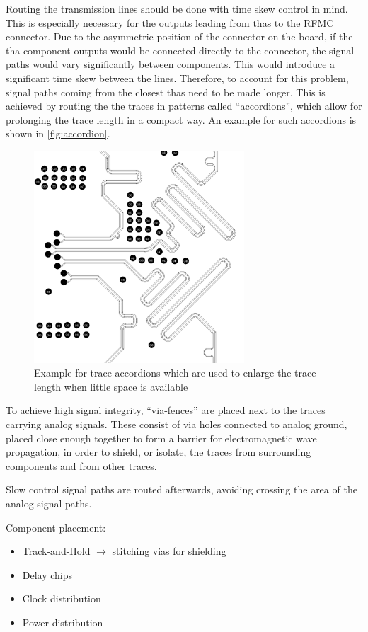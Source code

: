 Routing the transmission lines should be done with time skew control in mind. 
This is especially necessary for the outputs leading from \glspl{tha} to the RFMC connector. 
Due to the asymmetric position of the connector on the board, if the \gls{tha} component outputs would be connected directly to the connector, the signal paths would vary significantly between components.
This would introduce a significant time skew between the lines.
Therefore, to account for this problem, signal paths coming from the closest \glspl{tha} need to be made longer.
This is achieved by routing the the traces in patterns called ``accordions'', which allow for prolonging the trace length in a compact way.
An example for such accordions is shown in \autoref{fig:accordion}.
\begin{figure}[tbh]
	\centering
	\includegraphics[width = 0.7\textwidth]{chap/04-theresa/img/pcb/accordion}
	\caption[Trace accordions]{Example for trace accordions which are used to enlarge the trace length when little space is available}
	\label{fig:accordion}
\end{figure}

To achieve high signal integrity, ``via-fences'' are placed next to the traces carrying analog signals. 
These consist of via holes connected to analog ground, placed close enough together to form a barrier for electromagnetic wave propagation, in order to shield, or isolate, the traces from surrounding components and from other traces. 


Slow control signal paths are routed afterwards, avoiding crossing the area of the analog signal paths.

Component placement:
\begin{itemize}
	\item Track-and-Hold $\rightarrow$ stitching vias for shielding
	\item Delay chips 
	\item Clock distribution
	\item Power distribution 
\end{itemize}

